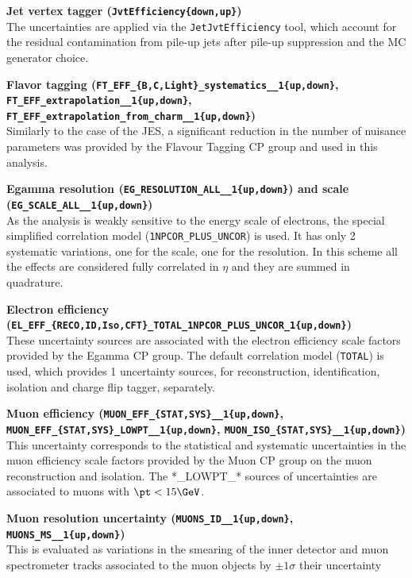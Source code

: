\textbf{Jet vertex tagger ({\tt{JvtEfficiency\{down,up\}}})}\\   %
The uncertainties are applied via the {\tt JetJvtEfficiency} tool, which account for the residual contamination from pile-up jets after pile-up suppression and the MC generator choice.

\textbf{Flavor tagging ({\tt{FT\_EFF\_\{B,C,Light\}\_systematics\_\_1\{up,down\}}}, {\tt{FT\_EFF\_extrapolation\_\_1\{up,down\}}}, {\tt{FT\_EFF\_extrapolation\_from\_charm\_\_1\{up,down\}}})} \\  %
Similarly to the case of the JES, a significant reduction in the number of nuisance parameters was provided by the Flavour Tagging CP group and used in this analysis.

\textbf{Egamma resolution ({\tt{EG\_RESOLUTION\_ALL\_\_1\{up,down\}}}) and scale ({\tt{EG\_SCALE\_ALL\_\_1\{up,down\}}})} \\ %
As the analysis is weakly sensitive to the energy scale of electrons, the special simplified correlation model ({\tt 1NPCOR\_PLUS\_UNCOR}) is used. It has only 2 systematic variations, one for the scale, one for the resolution. In this scheme all the effects are considered fully correlated in $\eta$ and they are summed in quadrature.

\textbf{Electron efficiency ({\tt{EL\_EFF\_\{RECO,ID,Iso,CFT\}\_TOTAL\_1NPCOR\_PLUS\_UNCOR\_1\{up,down\}}})}\\  %
These uncertainty sources are associated with the electron efficiency scale factors provided by the Egamma CP group. The default correlation model ({\tt TOTAL}) is used, which provides 1 uncertainty sources, for reconstruction, identification, isolation and charge flip tagger, separately. 

\textbf{Muon efficiency ({\tt{MUON\_EFF\_\{STAT,SYS\}\_\_1\{up,down\}}}, {\tt{MUON\_EFF\_\{STAT,SYS\}\_LOWPT\_\_1\{up,down\}}}, %
{\tt{MUON\_ISO\_\{STAT,SYS\}\_\_1\{up,down\}}})}\\ %
This uncertainty corresponds to the statistical and systematic uncertainties in the muon efficiency scale factors provided by the Muon CP group on the muon reconstruction and isolation. The *\_LOWPT\_* sources of uncertainties are associated to  muons with $\pt<15 \GeV$.

\textbf{Muon resolution uncertainty  ({\tt{MUONS\_ID\_\_1\{up,down\}}}, {\tt{MUONS\_MS\_\_1\{up,down\}}})} \\  %
This is evaluated as variations in the smearing of the inner detector and muon spectrometer tracks associated to the muon objects by $\pm 1\sigma$ their uncertainty

